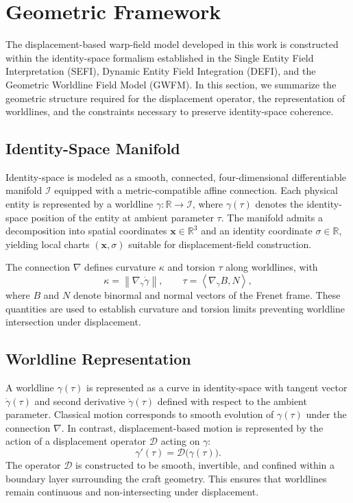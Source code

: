 \documentclass[aip,adv,reprint,floatfix]{revtex4-2}
\begin{document}
\section{Geometric Framework}

The displacement-based warp-field model developed in this work is constructed within the identity-space formalism established in the Single Entity Field Interpretation (SEFI), Dynamic Entity Field Integration (DEFI), and the Geometric Worldline Field Model (GWFM). In this section, we summarize the geometric structure required for the displacement operator, the representation of worldlines, and the constraints necessary to preserve identity-space coherence.

\subsection{Identity-Space Manifold}

Identity-space is modeled as a smooth, connected, four-dimensional differentiable manifold $\mathcal{I}$ equipped with a metric-compatible affine connection. Each physical entity is represented by a worldline $\gamma : \mathbb{R} \rightarrow \mathcal{I}$, where $\gamma(\tau)$ denotes the identity-space position of the entity at ambient parameter $\tau$. The manifold admits a decomposition into spatial coordinates $\mathbf{x} \in \mathbb{R}^3$ and an identity coordinate $\sigma \in \mathbb{R}$, yielding local charts $(\mathbf{x},\sigma)$ suitable for displacement-field construction.

The connection $\nabla$ defines curvature $\kappa$ and torsion $\tau$ along worldlines, with
\begin{equation}
\kappa = \left\| \nabla_{\dot{\gamma}} \dot{\gamma} \right\|,
\qquad
\tau = \left\langle \nabla_{\dot{\gamma}} B, N \right\rangle,
\end{equation}
where $B$ and $N$ denote binormal and normal vectors of the Frenet frame. These quantities are used to establish curvature and torsion limits preventing worldline intersection under displacement.

\subsection{Worldline Representation}

A worldline $\gamma(\tau)$ is represented as a curve in identity-space with tangent vector $\dot{\gamma}(\tau)$ and second derivative $\ddot{\gamma}(\tau)$ defined with respect to the ambient parameter. Classical motion corresponds to smooth evolution of $\gamma(\tau)$ under the connection $\nabla$. In contrast, displacement-based motion is represented by the action of a displacement operator $\mathcal{D}$ acting on $\gamma$:
\begin{equation}
\gamma'(\tau) = \mathcal{D}\big(\gamma(\tau)\big).
\end{equation}
The operator $\mathcal{D}$ is constructed to be smooth, invertible, and confined within a boundary layer surrounding the craft geometry. This ensures that worldlines remain continuous and non-intersecting under displacement.
\end{document}
